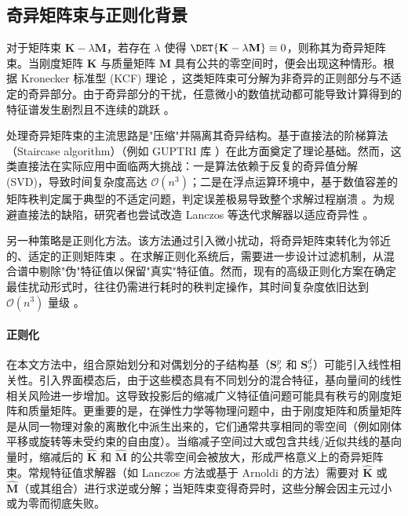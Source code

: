 \subsection{奇异矩阵束与正则化背景}

对于矩阵束 $\mathbf{K} - \lambda \mathbf{M}$，若存在 $\lambda$ 使得 $\DET{\mathbf{K} - \lambda \mathbf{M}} \equiv 0$，则称其为奇异矩阵束。当刚度矩阵 $\mathbf{K}$ 与质量矩阵 $\mathbf{M}$ 具有公共的零空间时，便会出现这种情形。根据 Kronecker 标准型 (KCF) 理论 \cite{gantmakher2000theory, Van1979Kronecker, Berger2012QuasiKroneckerFrom}，这类矩阵束可分解为非奇异的正则部分与不适定的奇异部分。由于奇异部分的干扰，任意微小的数值扰动都可能导致计算得到的特征谱发生剧烈且不连续的跳跃 \cite{Hochstenbach2019SolvingSingular, Kressner2024AnalysisOfeigenvalue}。

处理奇异矩阵束的主流思路是"压缩"并隔离其奇异结构。基于直接法的阶梯算法（Staircase algorithm）\cite{Demmel1993TheGS, Van1979Kronecker}（例如 GUPTRI 库 \cite{Demmel1993TheGS}）在此方面奠定了理论基础。然而，这类直接法在实际应用中面临两大挑战：一是算法依赖于反复的奇异值分解 (SVD)，导致时间复杂度高达 $\mathcal{O}(n^3)$；二是在浮点运算环境中，基于数值容差的矩阵秩判定属于典型的不适定问题，判定误差极易导致整个求解过程崩溃 \cite{Edelman2000StaircaseFailures}。为规避直接法的缺陷，研究者也尝试改造 Lanczos 等迭代求解器以适应奇异性 \cite{Lin2021ShiftInvertLanczos, karl2024ShiftInvertArnoldi}。

另一种策略是正则化方法。该方法通过引入微小扰动，将奇异矩阵束转化为邻近的、适定的正则矩阵束 \cite{Fernando2008FirstOrder, Hochstenbach2019SolvingSingular}。在求解正则化系统后，需要进一步设计过滤机制，从混合谱中剔除"伪"特征值以保留"真实"特征值。然而，现有的高级正则化方案在确定最佳扰动形式时，往往仍需进行耗时的秩判定操作，其时间复杂度依旧达到 $\mathcal{O}(n^3)$ 量级 \cite{Hochstenbach2019SolvingSingular, karl2024ShiftInvertArnoldi}。

\paragraph{正则化}

在本文方法中，组合原始划分和对偶划分的子结构基（$\mathbf{S}^p_{\mathcal{I}}$ 和 $\mathbf{S}^d_{\mathcal{I}}$）可能引入线性相关性。引入界面模态后，由于这些模态具有不同划分的混合特征，基向量间的线性相关风险进一步增加。这导致投影后的缩减广义特征值问题可能具有秩亏的刚度矩阵和质量矩阵。更重要的是，在弹性力学等物理问题中，由于刚度矩阵和质量矩阵是从同一物理对象的离散化中派生出来的，它们通常共享相同的零空间（例如刚体平移或旋转等未受约束的自由度）。当缩减子空间过大或包含共线/近似共线的基向量时，缩减后的 $\hat{\mathbf{K}}$ 和 $\hat{\mathbf{M}}$ 的公共零空间会被放大，形成严格意义上的奇异矩阵束。常规特征值求解器（如 Lanczos 方法或基于 Arnoldi 的方法）需要对 $\hat{\mathbf{K}}$ 或 $\hat{\mathbf{M}}$（或其组合）进行求逆或分解；当矩阵束变得奇异时，这些分解会因主元过小或为零而彻底失败。

